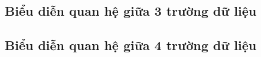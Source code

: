 \documentclass[a4paper, 12pt]{article}
\begin{document}
    \subsection{Biểu diễn quan hệ giữa 3 trường dữ liệu}

    \subsection{Biểu diễn quan hệ giữa 4 trường dữ liệu}
\end{document}
